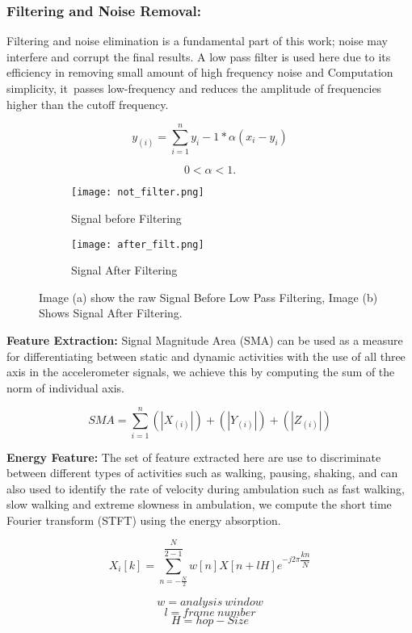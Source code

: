 \documentclass[a4paper, parskip=full]{scrartcl}
\begin{document}
\subsubsection*{Filtering and Noise Removal:} Filtering and noise elimination is a fundamental part of this work; noise may interfere and corrupt the final results. A low pass filter is used here due to its efficiency in removing small amount of high frequency noise and Computation simplicity, it passes low-frequency and reduces the amplitude of frequencies higher than the cutoff frequency.


\[y_{(i)} = \sum_{i =1}^{n}y_i-1 * \alpha(x_i-y_i)\]

\[0 < \alpha< 1.\]

\begin{figure}
	\begin{subfigure}{.5\textwidth}
		\centering
		\texttt{[image: not\_filter.png]}
		\caption{Signal before Filtering }
		\label{fig:sub1}
	\end{subfigure}
	\begin{subfigure}{.5\textwidth}
		\centering
		\texttt{[image: after\_filt.png]}
		\caption{Signal After Filtering}
		\label{fig:sub2}
	\end{subfigure}
	
	\caption{Image (a) show the raw Signal Before Low Pass Filtering, Image (b) Shows Signal After Filtering.}
	
\end{figure}
\textbf{Feature Extraction:} Signal Magnitude Area (SMA) can be used as a measure for differentiating between static and dynamic activities with the use of all three axis in the accelerometer signals, we achieve this by computing the sum of the norm of individual axis.  

\[SMA = \sum_{i =1}^{n}{(|X_{(i)}|)} + {(|Y_{(i)}|)} + {(|Z_{(i)}|)}\]

\textbf{Energy Feature:} The set of feature extracted here are use to  discriminate between different  types of activities such as walking, pausing, shaking, and can also used to identify the rate of velocity during ambulation such as fast walking, slow walking and extreme slowness in ambulation, we compute the short time Fourier transform (STFT) using the energy absorption.


\[X_i{[k]} = \sum_{n = -\frac{N}{2}}^{\dfrac{N}{2-1}}{w{[n]X}}  {[n + l H]e} ^{-j2\pi\dfrac{kn}{N}}\]

\[w = analysis\ window \]
\[l = frame\ number\]
\[H = hop- Size\]
\end{document}

